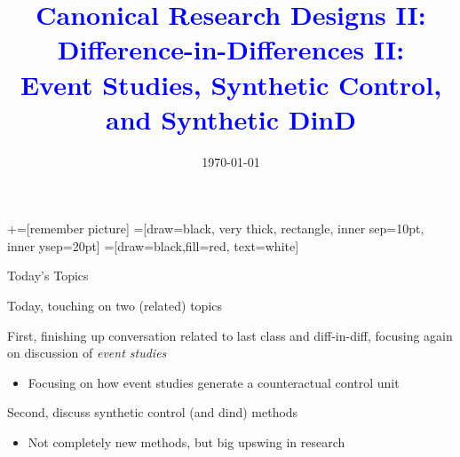 \documentclass[notes,11pt, aspectratio=169]{beamer}
\title[]{\textcolor{blue}{Canonical Research Designs II:\\ Difference-in-Differences II:\\
  Event Studies, Synthetic Control, and Synthetic DinD}}
\author[PGP]{}
\institute[FRBNY]{\small{\begin{tabular}{c}
  Paul Goldsmith-Pinkham  \\
\end{tabular}}}
\date{\today}
\newenvironment{wideitemize}{\itemize\addtolength{\itemsep}{10pt}}{\enditemize}
\begin{document}
\newcommand\marktopleft[1]{%
    \tikz[overlay,remember picture] 
        \node (marker-#1-a) at (-.3em,.3em) {};%
}
\newcommand\markbottomright[2]{%
    \tikz[overlay,remember picture] 
        \node (marker-#1-b) at (0em,0em) {};%
}
+=[remember picture] 
 =[draw=black, very thick, rectangle, inner sep=10pt, inner ysep=20pt]
 =[draw=black,fill=red, text=white]

\begin{frame}
\maketitle
\end{frame}

\begin{frame}{Today's Topics}
  \begin{wideitemize}
  \item Today, touching on two (related) topics
  \item First, finishing up conversation related to last class and
    diff-in-diff, focusing again on discussion of \emph{event studies}
    \begin{itemize}
    \item Focusing on how event studies generate a counteractual
      control unit
    \end{itemize}
  \item Second, discuss synthetic control (and dind) methods
    \begin{itemize}
    \item Not completely new methods, but big upswing in research
    \end{itemize}
  \end{wideitemize}
\end{frame}
\end{document}

